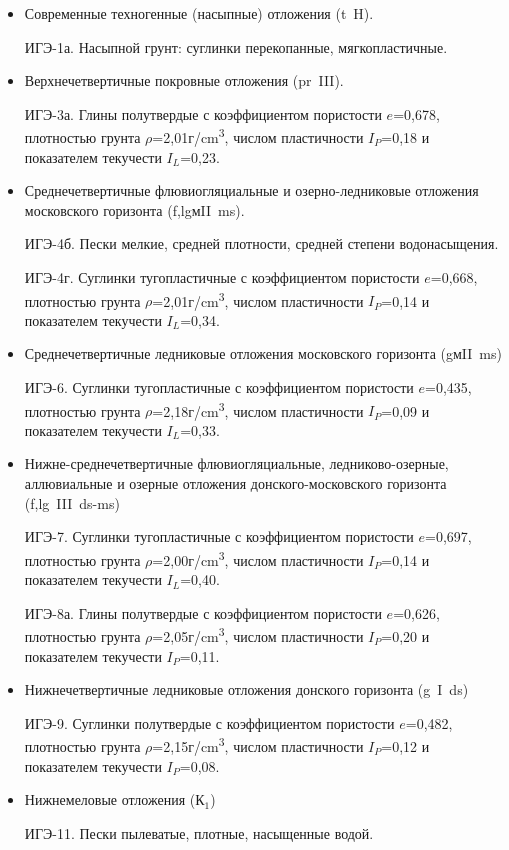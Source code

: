 \begin{itemize}
    \item  Современные техногенные (насыпные) отложения (t~H).
    
    ИГЭ-1а. Насыпной грунт: суглинки перекопанные, мягкопластичные.

    \item Верхнечетвертичные покровные отложения (pr~III).
    
    ИГЭ-3а. Глины полутвердые с коэффициентом пористости $e$=0,678, 
    плотностью грунта $\rho$=2,01г/\si{\centi\meter^3}, числом пластичности $I_P$=0,18 и 
    показателем текучести $I_L$=0,23.

    \item Среднечетвертичные флювиогляциальные и озерно-ледниковые отложения московского горизонта (f,lgмII~ms).
    
    ИГЭ-4б. Пески мелкие, средней плотности, средней степени водонасыщения.

    ИГЭ-4г. Суглинки тугопластичные с коэффициентом пористости $e$=0,668, 
    плотностью грунта $\rho$=2,01г/\si{\centi\meter^3}, числом пластичности $I_P$=0,14 и 
    показателем текучести $I_L$=0,34.

    \item Среднечетвертичные ледниковые отложения московского горизонта (gмII~ms)
    
    ИГЭ-6. Суглинки тугопластичные с коэффициентом пористости $e$=0,435, 
    плотностью грунта $\rho$=2,18г/\si{\centi\meter^3}, числом пластичности $I_P$=0,09 и показателем текучести $I_L$=0,33.

    \item Нижне-среднечетвертичные флювиогляциальные, ледниково-озерные, 
    аллювиальные и озерные отложения донского-московского горизонта (f,lg~III~ds-ms)

    ИГЭ-7. Суглинки тугопластичные с коэффициентом пористости $e$=0,697, 
    плотностью грунта $\rho$=2,00г/\si{\centi\meter^3}, числом пластичности $I_P$=0,14 и показателем текучести $I_L$=0,40. 

    ИГЭ-8а. Глины полутвердые с коэффициентом пористости $e$=0,626, 
    плотностью грунта $\rho$=2,05г/\si{\centi\meter^3}, числом пластичности $I_P$=0,20 и показателем текучести $I_P$=0,11.

    \item Нижнечетвертичные ледниковые отложения донского горизонта (g~I~ds)
    
    ИГЭ-9. Суглинки полутвердые с коэффициентом пористости $e$=0,482, 
    плотностью грунта $\rho$=2,15г/\si{\centi\meter^3}, числом пластичности $I_P$=0,12 и показателем текучести $I_P$=0,08.

    \item Нижнемеловые отложения ($К_1$)
    
    ИГЭ-11. Пески пылеватые, плотные, насыщенные водой.

\end{itemize}